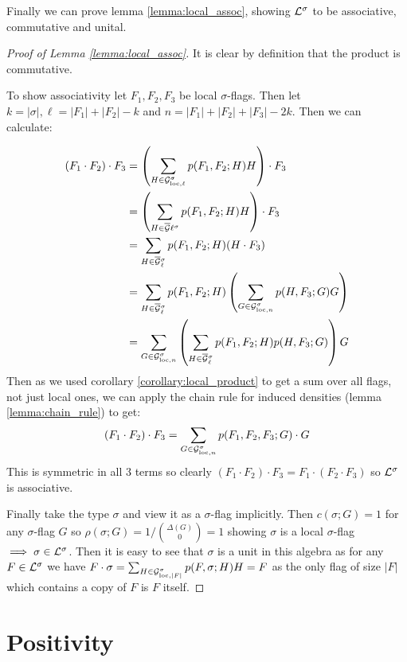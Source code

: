 Finally we can prove lemma \ref{lemma:local_assoc}, showing $\mathcal{L}^\sigma$ to be associative,
commutative and unital.

\begin{proof}[Proof of Lemma \ref{lemma:local_assoc}]
    It is clear by definition that the product is commutative.

    To show associativity let $F_1, F_2, F_3$ be local $\sigma$-flags.
    Then let $k = |\sigma|, \ell = |F_1|+|F_2|-k$ and $n = |F_1|+|F_2|+|F_3|-2k$. Then
    we can calculate:

    \[
        \begin{split}
            (F_1 \cdot F_2) \cdot F_3
            &= \left(\sum_{H\in\mathcal{G}_{\mathrm{loc},\ell}^\sigma} p(F_1,F_2;H)H\right) \cdot F_3\\
            &= \left(\sum_{H\in\overline{\mathcal{G}}{}\ell^\sigma} p(F_1,F_2;H)H\right) \cdot F_3\\
            &= \sum_{H\in\overline{\mathcal{G}}{}_\ell^\sigma} p(F_1,F_2;H)(H \cdot F_3)\\
            &= \sum_{H\in\overline{\mathcal{G}}{}_\ell^\sigma} p(F_1,F_2;H)
                \left(\sum_{G\in\mathcal{G}_{\mathrm{loc},n}^\sigma} p(H,F_3;G)G \right)\\
            &= \sum_{G\in\mathcal{G}_{\mathrm{loc},n}^\sigma}
                \left(\sum_{H\in\overline{\mathcal{G}}{}_\ell^\sigma} p(F_1,F_2;H) p(H,F_3;G) \right) G
        \end{split}
    \]
    Then as we used corollary \ref{corollary:local_product} to get a sum over all flags, not just local ones, we can
    apply the chain rule for induced densities (lemma \ref{lemma:chain_rule})
    to get:
    \[
            (F_1 \cdot F_2) \cdot F_3
            = \sum_{G\in\mathcal{G}_{\mathrm{loc},n}^\sigma} p(F_1, F_2, F_3; G)\cdot G
    \]
    This is symmetric in all 3 terms so clearly $(F_1\cdot F_2)\cdot F_3 = F_1 \cdot (F_2\cdot F_3)$
    so $\mathcal{L}^\sigma$ is associative.

    Finally take the type $\sigma$ and view it as a $\sigma$-flag implicitly. Then
    $c(\sigma; G)=1$ for any $\sigma$-flag $G$ so $\rho(\sigma; G)=1/\binom{\Delta(G)}{0}=1$
    showing $\sigma$ is a local $\sigma$-flag $\implies \sigma\in\mathcal{L}^\sigma$.
    Then it is easy to see that $\sigma$ is a unit in this algebra as for any
    $F\in\mathcal{L}^\sigma$ we have
    $F\cdot\sigma = \sum_{H \in \mathcal{G}_{\mathrm{loc},|F|}^\sigma}p(F,\sigma; H)H=F$
    as the only flag of size $|F|$ which contains a copy of $F$ is $F$ itself.
\end{proof}

\section{Positivity}

